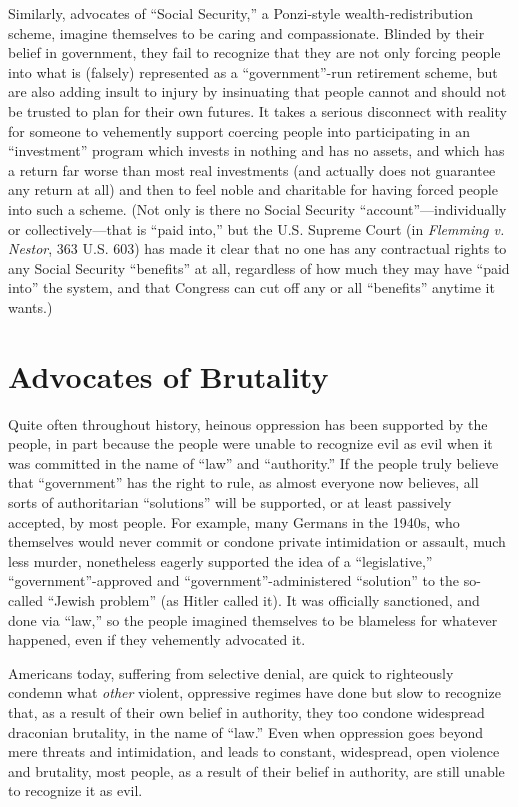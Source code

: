 \documentclass{book}
\begin{document}
Similarly, advocates of \enquote{Social Security,} a Ponzi-style wealth-redistribution scheme, imagine themselves to be caring and compassionate. Blinded by their belief in government, they fail to recognize that they are not only forcing people into what is (falsely) represented as a \enquote{government}-run retirement scheme, but are also adding insult to injury by insinuating that people cannot and should not be trusted to plan for their own futures. It takes a serious disconnect with reality for someone to vehemently support coercing people into participating in an \enquote{investment} program which invests in nothing and has no assets, and which has a return far worse than most real investments (and actually does not guarantee any return at all) and then to feel noble and charitable for having forced people into such a scheme. (Not only is there no Social Security \enquote{account}---individually or collectively---that is \enquote{paid into,} but the U.S. Supreme Court (in \emph{Flemming v. Nestor}, 363 U.S. 603) has made it clear that no one has any contractual rights to any Social Security \enquote{benefits} at all, regardless of how much they may have \enquote{paid into} the system, and that Congress can cut off any or all \enquote{benefits} anytime it wants.)

\section{Advocates of Brutality}

Quite often throughout history, heinous oppression has been supported by the people, in part because the people were unable to recognize evil as evil when it was committed in the name of \enquote{law} and \enquote{authority.} If the people truly believe that \enquote{government} has the right to rule, as almost everyone now believes, all sorts of authoritarian \enquote{solutions} will be supported, or at least passively accepted, by most people. For example, many Germans in the 1940s, who themselves would never commit or condone private intimidation or assault, much less murder, nonetheless eagerly supported the idea of a \enquote{legislative,} \enquote{government}-approved and \enquote{government}-administered \enquote{solution} to the so-called \enquote{Jewish problem} (as Hitler called it). It was officially sanctioned, and done via \enquote{law,} so the people imagined themselves to be blameless for whatever happened, even if they vehemently advocated it.

Americans today, suffering from selective denial, are quick to righteously condemn what \emph{other} violent, oppressive regimes have done but slow to recognize that, as a result of their own belief in authority, they too condone widespread draconian brutality, in the name of \enquote{law.} Even when oppression goes beyond mere threats and intimidation, and leads to constant, widespread, open violence and brutality, most people, as a result of their belief in authority, are still unable to recognize it as evil.
\end{document}
